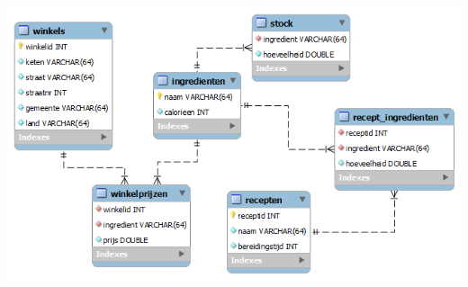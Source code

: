 \documentclass[a4paper]{article}
\begin{document}
\begin{center}
\includegraphics[width=\textwidth]{schema.png}
\end{center}
\end{document}
